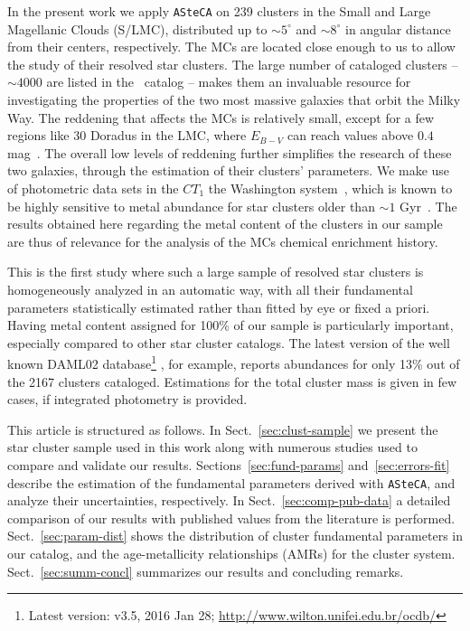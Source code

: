 \documentclass[draft]{aa}
\begin{document}
In the present work we apply \texttt{ASteCA} on 239 clusters in the Small and
Large Magellanic Clouds (S/LMC), distributed up to ${\sim}5^{\circ}$ and $
{\sim}8^{\circ}$ in angular distance from their centers, respectively.
%
The MCs are located close enough to us to allow the study of their resolved star
clusters. The large number of cataloged clusters -- $\sim4000$ are listed in
the~\cite{Bica_2008} catalog -- makes them an invaluable resource for
investigating the properties of the two most massive galaxies that orbit the
Milky Way.
%
The reddening that affects the MCs is relatively small, except for a few regions
like 30 Doradus in the LMC, where $E_{B-V}$ can reach values above $0.4$
mag~\citep{Piatti_2015b}. The overall low levels of reddening further simplifies
the research of these two galaxies, through the estimation of their clusters'
parameters.
%
We make use of photometric data sets in the $CT_1$ the Washington
system~\citep{Canterna_1976,Geisler_1996}, which is known to be highly sensitive
to metal abundance for star clusters older than ${\sim}1$
Gyr~\citep{Geisler_1999}.
The results obtained here regarding the metal content of the clusters in our
sample are thus of relevance for the analysis of the MCs chemical
enrichment history.

This is the first study where such a large sample of resolved star clusters is
homogeneously analyzed in an automatic way, with all their fundamental
parameters statistically estimated rather than fitted by eye or fixed a priori.
%
Having metal content assigned for 100\% of our sample is particularly
important, especially compared to other star cluster catalogs. The latest
version of the well known DAML02 database\footnote{Latest version: v3.5, 2016
Jan 28; \url{http://www.wilton.unifei.edu.br/ocdb/}}
\citep{Dias_2002}, for example, reports abundances for only 13\% out of the 2167
clusters cataloged. Estimations for the total cluster mass is given in few
cases, if integrated photometry is provided.

This article is structured as follows.
In Sect.~\ref{sec:clust-sample} we present the star cluster sample used in
this work along with numerous studies used to compare and validate our
results.
Sections~\ref{sec:fund-params} and~\ref{sec:errors-fit} describe the estimation
of the fundamental parameters derived with \texttt{ASteCA}, and analyze their
uncertainties, respectively.
In Sect.~\ref{sec:comp-pub-data} a detailed comparison of our results with
published values from the literature is performed.
Sect.~\ref{sec:param-dist} shows the distribution of cluster fundamental
parameters in our catalog, and the age-metallicity relationships (AMRs) for the
cluster system.
Sect.~\ref{sec:summ-concl} summarizes our results and concluding remarks.
\end{document}
